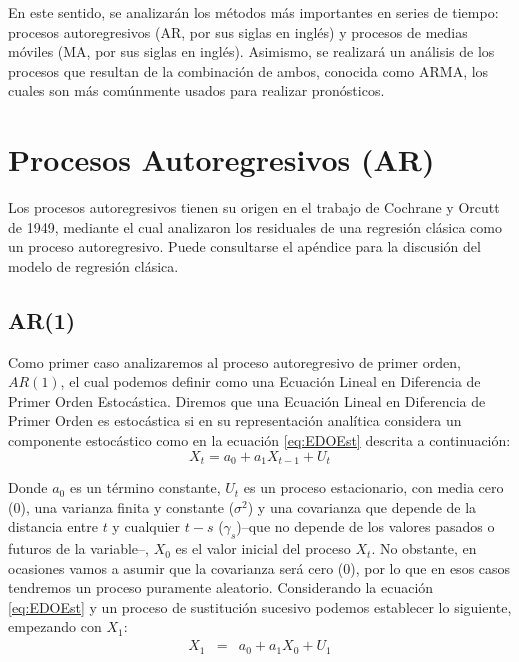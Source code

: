 \documentclass[
]{book}
\begin{document}
En este sentido, se analizarán los métodos más importantes en series de tiempo: procesos autoregresivos (AR, por sus siglas en inglés) y procesos de medias móviles (MA, por sus siglas en inglés). Asimismo, se realizará un análisis de los procesos que resultan de la combinación de ambos, conocida como ARMA, los cuales son más comúnmente usados para realizar pronósticos.

\hypertarget{procesos-autoregresivos-ar}{%
\section{Procesos Autoregresivos (AR)}\label{procesos-autoregresivos-ar}}

Los procesos autoregresivos tienen su origen en el trabajo de Cochrane y Orcutt de 1949, mediante el cual analizaron los residuales de una regresión clásica como un proceso autoregresivo. Puede consultarse el apéndice para la discusión del modelo de regresión clásica.

\hypertarget{ar1}{%
\subsection{AR(1)}\label{ar1}}

Como primer caso analizaremos al proceso autoregresivo de primer orden, \(AR(1)\), el cual podemos definir como una Ecuación Lineal en Diferencia de Primer Orden Estocástica. Diremos que una Ecuación Lineal en Diferencia de Primer Orden es estocástica si en su representación analítica considera un componente estocástico como en la ecuación \eqref{eq:EDOEst} descrita a continuación:
\begin{equation}
    X_t = a_0 + a_1 X_{t-1} + U_t
    \label{eq:EDOEst}
\end{equation}

Donde \(a_0\) es un término constante, \(U_t\) es un proceso estacionario, con media cero (0), una varianza finita y constante (\(\sigma^2\)) y una covarianza que depende de la distancia entre \(t\) y cualquier \(t-s\) (\(\gamma_s\))--que no depende de los valores pasados o futuros de la variable--, \(X_0\) es el valor inicial del proceso \(X_t\). No obstante, en ocasiones vamos a asumir que la covarianza será cero (0), por lo que en esos casos tendremos un proceso puramente aleatorio. Considerando la ecuación \eqref{eq:EDOEst} y un proceso de sustitución sucesivo podemos establecer lo siguiente, empezando con \(X_1\):
\begin{eqnarray*}
    X_{1} & = & a_0 + a_1 X_{0} + U_{1}
\end{eqnarray*}
\end{document}

